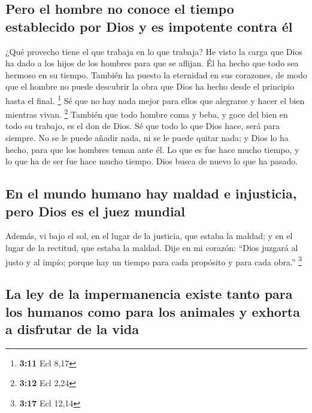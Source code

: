 \begin{paracol}{2}
\hypertarget{pero-el-hombre-no-conoce-el-tiempo-establecido-por-dios-y-es-impotente-contra-uxe9l}{%
\subsection{Pero el hombre no conoce el tiempo establecido por Dios y es
impotente contra
él}\label{pero-el-hombre-no-conoce-el-tiempo-establecido-por-dios-y-es-impotente-contra-uxe9l}}

 ¿Qué provecho tiene el que trabaja en lo que trabaja?
 He visto la carga que Dios ha dado a los hijos de los
hombres para que se aflijan.  Él ha hecho que todo sea
hermoso en su tiempo. También ha puesto la eternidad en sus corazones,
de modo que el hombre no puede descubrir la obra que Dios ha hecho desde
el principio hasta el final. \footnote{\textbf{3:11} Ecl 8,17}
 Sé que no hay nada mejor para ellos que alegrarse y
hacer el bien mientras vivan. \footnote{\textbf{3:12} Ecl 2,24}
 También que todo hombre coma y beba, y goce del bien en
todo su trabajo, es el don de Dios.  Sé que todo lo que
Dios hace, será para siempre. No se le puede añadir nada, ni se le puede
quitar nada; y Dios lo ha hecho, para que los hombres teman ante él.
 Lo que es fue hace mucho tiempo, y lo que ha de ser fue
hace mucho tiempo. Dios busca de nuevo lo que ha pasado.

\hypertarget{en-el-mundo-humano-hay-maldad-e-injusticia-pero-dios-es-el-juez-mundial}{%
\subsection{En el mundo humano hay maldad e injusticia, pero Dios es el
juez
mundial}\label{en-el-mundo-humano-hay-maldad-e-injusticia-pero-dios-es-el-juez-mundial}}

 Además, vi bajo el sol, en el lugar de la justicia, que
estaba la maldad; y en el lugar de la rectitud, que estaba la maldad.
 Dije en mi corazón: ``Dios juzgará al justo y al impío;
porque hay un tiempo para cada propósito y para cada obra.'' \footnote{\textbf{3:17}
  Ecl 12,14}

\hypertarget{la-ley-de-la-impermanencia-existe-tanto-para-los-humanos-como-para-los-animales-y-exhorta-a-disfrutar-de-la-vida}{%
\subsection{La ley de la impermanencia existe tanto para los humanos
como para los animales y exhorta a disfrutar de la
vida}\label{la-ley-de-la-impermanencia-existe-tanto-para-los-humanos-como-para-los-animales-y-exhorta-a-disfrutar-de-la-vida}}


\end{paracol}
